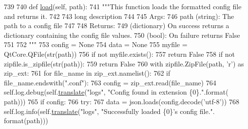 \begin{DoxyCode}
739 
740     \textcolor{keyword}{def }\hyperlink{classcommotion__client_1_1utils_1_1extension__manager_1_1ConfigManager_a3da851319b205bf97e350946b4408ff8}{load}(self, path):
741         \textcolor{stringliteral}{"""This function loads the formatted config file and returns it.}
742 \textcolor{stringliteral}{        }
743 \textcolor{stringliteral}{        long description}
744 \textcolor{stringliteral}{        }
745 \textcolor{stringliteral}{        Args:}
746 \textcolor{stringliteral}{        path (string): The path to a config file}
747 \textcolor{stringliteral}{        }
748 \textcolor{stringliteral}{        Returns:}
749 \textcolor{stringliteral}{          (dictionary) On success returns a dictionary containing the config file values.}
750 \textcolor{stringliteral}{          (bool): On failure returns False}
751 \textcolor{stringliteral}{        }
752 \textcolor{stringliteral}{        """}
753         config = \textcolor{keywordtype}{None}
754         data = \textcolor{keywordtype}{None}
755         myfile = QtCore.QFile(str(path))
756         \textcolor{keywordflow}{if} \textcolor{keywordflow}{not} myfile.exists():
757             \textcolor{keywordflow}{return} \textcolor{keyword}{False}
758         \textcolor{keywordflow}{if} \textcolor{keywordflow}{not} zipfile.is\_zipfile(str(path)):
759             \textcolor{keywordflow}{return} \textcolor{keyword}{False}
760         with zipfile.ZipFile(path, \textcolor{stringliteral}{'}\textcolor{stringliteral}{r') as zip\_ext:}
761 \textcolor{stringliteral}{            }\textcolor{keywordflow}{for} file\_name \textcolor{keywordflow}{in} zip\_ext.namelist():
762                 \textcolor{keywordflow}{if} file\_name.endswith(\textcolor{stringliteral}{".conf"}):
763                     config = zip\_ext.read(file\_name)
764                     self.log.debug(self.\hyperlink{classcommotion__client_1_1utils_1_1extension__manager_1_1ConfigManager_aa0ce09aefdd36656f0a1abfad14e9ff1}{translate}(\textcolor{stringliteral}{"logs"}, \textcolor{stringliteral}{"Config found in extension \{0\}."}.format(
      path)))
765         \textcolor{keywordflow}{if} config:
766             \textcolor{keywordflow}{try}:
767                 data = json.loads(config.decode(\textcolor{stringliteral}{'utf-8'}))
768                 self.log.info(self.\hyperlink{classcommotion__client_1_1utils_1_1extension__manager_1_1ConfigManager_aa0ce09aefdd36656f0a1abfad14e9ff1}{translate}(\textcolor{stringliteral}{"logs"}, \textcolor{stringliteral}{"Successfully loaded \{0\}'s config file."}.
      format(path)))

\end{DoxyCode}
